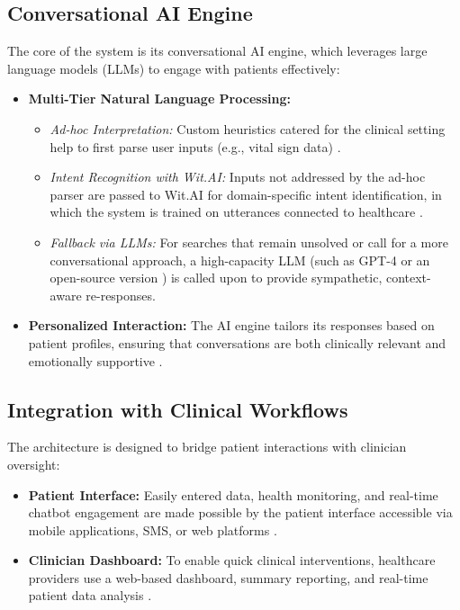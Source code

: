 \subsection{Conversational AI Engine}
The core of the system is its conversational AI engine, which leverages large language models (LLMs) to engage with patients effectively:
\begin{itemize}[itemsep=2em]
    \item \textbf{Multi-Tier Natural Language Processing:} 
    \begin{itemize}[itemsep=2em]
        \item \emph{Ad-hoc Interpretation:} Custom heuristics catered for the clinical setting help to first parse user inputs (e.g., vital sign data) \cite{montagna2023}.
        \item \emph{Intent Recognition with Wit.AI:} Inputs not addressed by the ad-hoc parser are passed to Wit.AI for domain-specific intent identification, in which the system is trained on utterances connected to healthcare \cite{montagna2023}.
        \item \emph{Fallback via LLMs:} For searches that remain unsolved or call for a more conversational approach, a high-capacity LLM (such as GPT-4 \cite{gpt4tech} or an open-source version \cite{llama2023, mistral7b}) is called upon to provide sympathetic, context-aware re-responses.
    \end{itemize}
    \item \textbf{Personalized Interaction:} The AI engine tailors its responses based on patient profiles, ensuring that conversations are both clinically relevant and emotionally supportive \cite{llama2023}.
\end{itemize}

\subsection{Integration with Clinical Workflows}
The architecture is designed to bridge patient interactions with clinician oversight:
\begin{itemize}[itemsep=2em]
    \item \textbf{Patient Interface:} Easily entered data, health monitoring, and real-time chatbot engagement are made possible by the patient interface accessible via mobile applications, SMS, or web platforms \cite{ayers2023}.
    \item \textbf{Clinician Dashboard:} To enable quick clinical interventions, healthcare providers use a web-based dashboard, summary reporting, and real-time patient data analysis \cite{cascella2023}.
\end{itemize}

